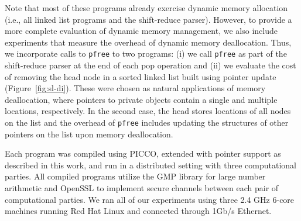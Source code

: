 \documentclass[11pt]{article}
\begin{document}
Note that most of these programs already exercise dynamic memory allocation
(i.e., all linked list programs and the shift-reduce parser). However, to
provide a more complete evaluation of dynamic memory management, we also
include experiments that measure the overhead of dynamic memory
deallocation. Thus, we incorporate calls to \texttt{pfree} to two programs:
(i) we call \texttt{pfree} as part of the shift-reduce parser at the end of
each pop operation and (ii) we evaluate the cost of removing the head node
in a sorted linked list built using pointer update (Figure~\ref{fig:sl-di}).
These were chosen as natural applications of memory deallocation, where
pointers to private objects contain a single and multiple locations,
respectively. In the second case, the head stores locations of all nodes on
the list and the overhead of \texttt{pfree} includes updating the structures
of other pointers on the list upon memory deallocation.

Each program was compiled using PICCO, extended with pointer support as
described in this work, and run in a distributed setting with three
computational parties. All compiled programs utilize the GMP library for
large number arithmetic and OpenSSL to implement secure channels between 
each pair of computational parties. We ran all of our experiments using
three 2.4 GHz 6-core machines running Red Hat Linux and connected through
1Gb/s Ethernet. 
\begin{table*} \centering \small {}
\caption{Performance of representative programs with unsorted data structures measured in seconds.} \label{tab:exp1}
\end{table*}
\end{document}
